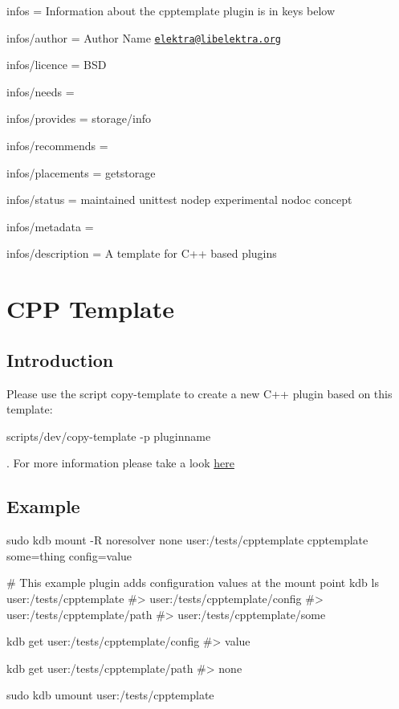 
\begin{DoxyItemize}
\item infos = Information about the cpptemplate plugin is in keys below
\item infos/author = Author Name \href{mailto:elektra@libelektra.org}{\tt elektra@libelektra.\+org}
\item infos/licence = B\+SD
\item infos/needs =
\item infos/provides = storage/info
\item infos/recommends =
\item infos/placements = getstorage
\item infos/status = maintained unittest nodep experimental nodoc concept
\item infos/metadata =
\item infos/description = A template for C++ based plugins
\end{DoxyItemize}\hypertarget{autotoc_md106_src_plugins_cpptemplate_README_md}{}\section{C\+P\+P Template}\label{autotoc_md106_src_plugins_cpptemplate_README_md}
\hypertarget{autotoc_md106_autotoc_md107}{}\subsection{Introduction}\label{autotoc_md106_autotoc_md107}
Please use the script copy-\/template to create a new C++ plugin based on this template\+:


\begin{DoxyCode}
scripts/dev/copy-template -p pluginname
\end{DoxyCode}


. For more information please take a look \hyperlink{autotoc_md634_src_plugins_template_README_md}{here}\hypertarget{autotoc_md106_autotoc_md108}{}\subsection{Example}\label{autotoc_md106_autotoc_md108}

\begin{DoxyCode}
sudo kdb mount -R noresolver none user:/tests/cpptemplate cpptemplate some=thing config=value

# This example plugin adds configuration values at the mount point
kdb ls user:/tests/cpptemplate
#> user:/tests/cpptemplate/config
#> user:/tests/cpptemplate/path
#> user:/tests/cpptemplate/some

kdb get user:/tests/cpptemplate/config
#> value

kdb get user:/tests/cpptemplate/path
#> none

sudo kdb umount user:/tests/cpptemplate
\end{DoxyCode}
 